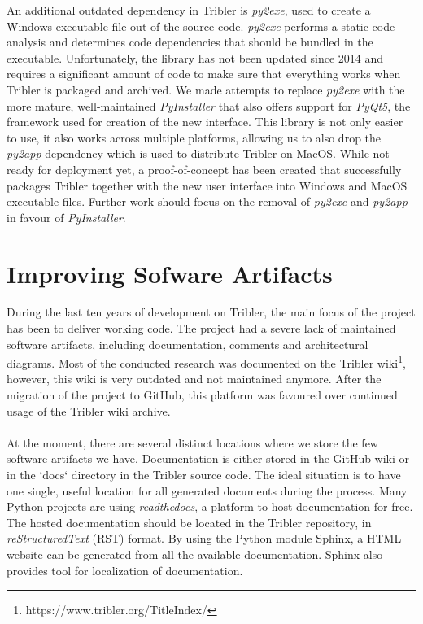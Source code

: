 An additional outdated dependency in Tribler is \emph{py2exe}, used to create a Windows executable file out of the source code. \emph{py2exe} performs a static code analysis and determines code dependencies that should be bundled in the executable. Unfortunately, the library has not been updated since 2014 and requires a significant amount of code to make sure that everything works when Tribler is packaged and archived. We made attempts to replace \emph{py2exe} with the more mature, well-maintained \emph{PyInstaller} that also offers support for \emph{PyQt5}, the framework used for creation of the new interface. This library is not only easier to use, it also works across multiple platforms, allowing us to also drop the \emph{py2app} dependency which is used to distribute Tribler on MacOS. While not ready for deployment yet, a proof-of-concept has been created that successfully packages Tribler together with the new user interface into Windows and MacOS executable files. Further work should focus on the removal of \emph{py2exe} and \emph{py2app} in favour of \emph{PyInstaller}.

\section{Improving Sofware Artifacts}
During the last ten years of development on Tribler, the main focus of the project has been to deliver working code. The project had a severe lack of maintained software artifacts, including documentation, comments and architectural diagrams. Most of the conducted research was documented on the Tribler wiki\footnote{https://www.tribler.org/TitleIndex/}, however, this wiki is very outdated and not maintained anymore. After the migration of the project to GitHub, this platform was favoured over continued usage of the Tribler wiki archive.\\\\
At the moment, there are several distinct locations where we store the few software artifacts we have. Documentation is either stored in the GitHub wiki or in the `docs` directory in the Tribler source code. The ideal situation is to have one single, useful location for all generated documents during the process. Many Python projects are using \emph{readthedocs}, a platform to host documentation for free. The hosted documentation should be located in the Tribler repository, in \emph{reStructuredText} (RST) format. By using the Python module Sphinx, a HTML website can be generated from all the available documentation. Sphinx also provides tool for localization of documentation.\\

